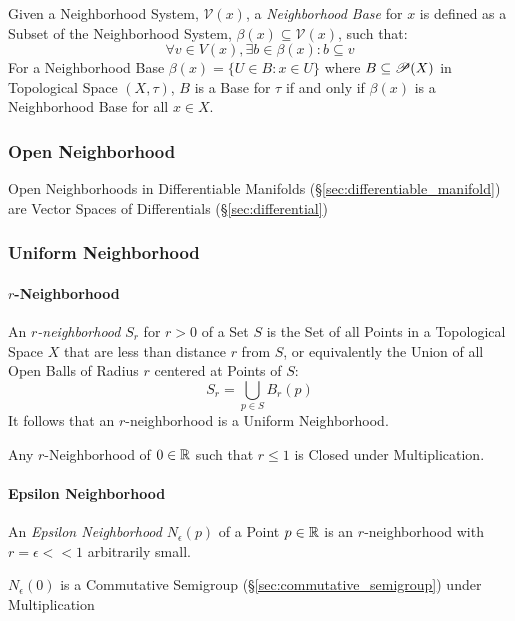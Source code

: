 Given a Neighborhood System, $\mathcal{V}(x)$, a \emph{Neighborhood
  Base} for $x$ is defined as a Subset of the Neighborhood System,
$\beta(x) \subseteq \mathcal{V}(x)$, such that:
\[
  \forall v \in V(x), \exists b \in \beta(x) : b \subseteq v
\]
For a Neighborhood Base $\beta(x) = \{ U \in B : x \in U \}$ where $B
\subseteq \mathscr{P}(X)$ in Topological Space $(X,\tau)$, $B$ is a
Base for $\tau$ if and only if $\beta(x)$ is a Neighborhood Base for
all $x \in X$.



\subsubsection{Open Neighborhood}\label{sec:open_neighborhood}

Open Neighborhoods in Differentiable Manifolds
(\S\ref{sec:differentiable_manifold}) are Vector Spaces of Differentials
(\S\ref{sec:differential})



\subsubsection{Uniform Neighborhood}\label{sec:uniform_neighborhood}

\paragraph{$r$-Neighborhood}\label{sec:r_neighborhood}\hfill

An \emph{$r$-neighborhood} $S_r$ for $r > 0$ of a Set $S$ is the Set of all
Points in a Topological Space $X$ that are less than distance $r$ from $S$, or
equivalently the Union of all Open Balls of Radius $r$ centered at Points of
$S$:
\[
  S_r = \bigcup_{p \in S} B_r (p)
\]
It follows that an $r$-neighborhood is a Uniform Neighborhood.

Any $r$-Neighborhood of $0 \in \mathbb{R}$ such that $r \leq 1$ is Closed under
Multiplication.



\paragraph{Epsilon Neighborhood}\label{sec:epsilon_neighborhood}\hfill

An \emph{Epsilon Neighborhood} $N_\epsilon(p)$ of a Point $p \in \mathbb{R}$ is an
$r$-neighborhood with $r = \epsilon << 1$ arbitrarily small.

$N_\epsilon(0)$ is a Commutative Semigroup (\S\ref{sec:commutative_semigroup})
under Multiplication



